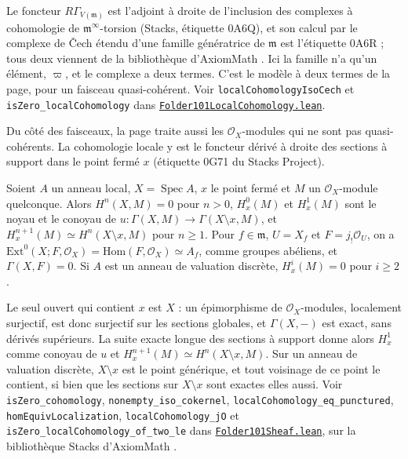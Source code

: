 \noindent Le foncteur $R\Gamma_{V(\mathfrak m)}$ est l'adjoint à droite de l'inclusion des complexes à cohomologie de $\mathfrak m^\infty$-torsion (Stacks, étiquette 0A6Q), et son calcul par le complexe de Čech étendu d'une famille génératrice de $\mathfrak m$ est l'étiquette 0A6R ; tous deux viennent de la bibliothèque d'AxiomMath \cite{axiomstacks}. Ici la famille n'a qu'un élément, $\varpi$, et le complexe a deux termes. C'est le modèle à deux termes de la page, pour un faisceau quasi-cohérent. Voir \texttt{localCohomologyIsoCech} et \texttt{isZero\_localCohomology} dans \href{\leanblobmain/AlgebraicGeometry/Folder101LocalCohomology.lean}{\texttt{Folder101LocalCohomology.\allowbreak{}lean}}.

Du côté des faisceaux, la page traite aussi les $\mathcal O_X$-modules qui ne sont pas quasi-cohérents. La cohomologie locale y est le foncteur dérivé à droite des sections à support dans le point fermé $x$ (étiquette 0G71 du Stacks Project).

\begin{enonce}
Soient $A$ un anneau local, $X = \operatorname{Spec} A$, $x$ le point fermé et $M$ un $\mathcal O_X$-module quelconque. Alors $H^n(X, M) = 0$ pour $n > 0$, $H^0_x(M)$ et $H^1_x(M)$ sont le noyau et le conoyau de $u : \Gamma(X, M) \to \Gamma(X \setminus x, M)$, et $H^{n+1}_x(M) \simeq H^n(X \setminus x, M)$ pour $n \geq 1$. Pour $f \in \mathfrak m$, $U = X_f$ et $F = j_!\mathcal O_U$, on a $\mathrm{Ext}^0(X; F, \mathcal O_X) = \mathrm{Hom}(F, \mathcal O_X) \simeq A_f$, comme groupes abéliens, et $\Gamma(X, F) = 0$. Si $A$ est un anneau de valuation discrète, $H^i_x(M) = 0$ pour $i \geq 2$.
\end{enonce}

\noindent Le seul ouvert qui contient $x$ est $X$ : un épimorphisme de $\mathcal O_X$-modules, localement surjectif, est donc surjectif sur les sections globales, et $\Gamma(X, -)$ est exact, sans dérivés supérieurs. La suite exacte longue des sections à support donne alors $H^1_x$ comme conoyau de $u$ et $H^{n+1}_x(M) \simeq H^n(X \setminus x, M)$. Sur un anneau de valuation discrète, $X \setminus x$ est le point générique, et tout voisinage de ce point le contient, si bien que les sections sur $X \setminus x$ sont exactes elles aussi. Voir \texttt{isZero\_cohomology}, \texttt{nonempty\_iso\_cokernel}, \texttt{localCohomology\_eq\_punctured}, \texttt{homEquivLocalization}, \texttt{localCohomology\_jO} et \texttt{isZero\_localCohomology\_of\_two\_le} dans \href{\leanblobmain/AlgebraicGeometry/Folder101Sheaf.lean}{\texttt{Folder101Sheaf.\allowbreak{}lean}}, sur la bibliothèque Stacks d'AxiomMath \cite{axiomstacks}.

